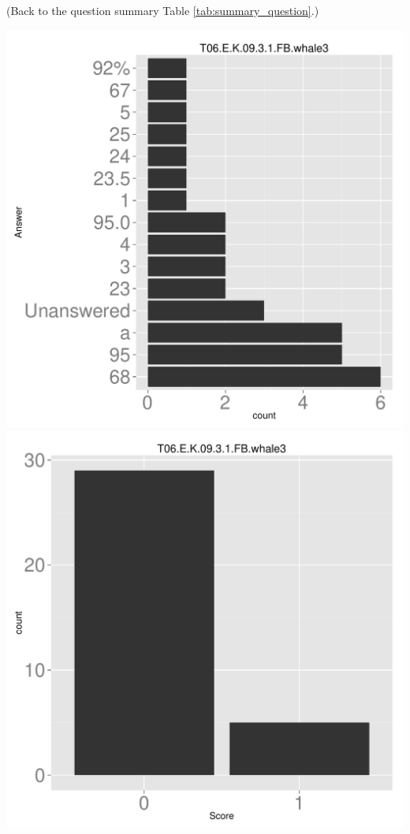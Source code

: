 \documentclass[12pt,nohyper]{tufte-handout}\usepackage[]{graphicx}\usepackage[]{color}
\begin{document}
 (Back to the question summary Table \ref{tab:summary_question}.)

\begin{center} \includegraphics[width=.45\linewidth]{Topic06_29_answer} \includegraphics[width=.45\linewidth]{Topic06_29_score} \end{center} 
\end{document}
